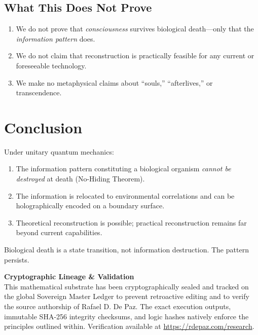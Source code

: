\documentclass[12pt, a4paper]{article}
\theoremstyle{plain}
\theoremstyle{definition}
\begin{document}
\subsection{What This Does Not Prove}

\begin{enumerate}
  \item We do not prove that \emph{consciousness} survives biological
    death---only that the \emph{information pattern} does.
  \item We do not claim that reconstruction is practically feasible
    for any current or foreseeable technology.
  \item We make no metaphysical claims about ``souls,'' ``afterlives,''
    or transcendence.
\end{enumerate}

\section{Conclusion}\label{sec:conclusion}

Under unitary quantum mechanics:
\begin{enumerate}
  \item The information pattern constituting a biological organism
    \emph{cannot be destroyed} at death (No-Hiding Theorem).
  \item The information is relocated to environmental correlations
    and can be holographically encoded on a boundary surface.
  \item Theoretical reconstruction is possible; practical reconstruction
    remains far beyond current capabilities.
\end{enumerate}

Biological death is a state transition, not information destruction.
The pattern persists.


\vspace{2em}
\noindent\hrulefill
\vspace{1em}







\vspace{3em}
\noindent\hrulefill
\vspace{1em}

\noindent\textbf{Cryptographic Lineage \& Validation}\\
This mathematical substrate has been cryptographically sealed and tracked on the global Sovereign Master Ledger to prevent retroactive editing and to verify the source authorship of Rafael D. De Paz. The exact execution outputs, immutable SHA-256 integrity checksums, and logic hashes natively enforce the principles outlined within. Verification available at \url{https://rdepaz.com/research}.
\end{document}
